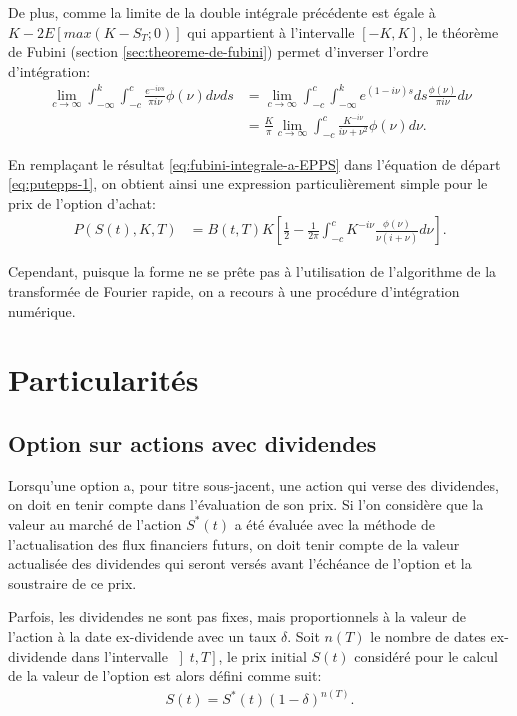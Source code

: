 De plus, comme la limite de la double intégrale précédente est égale à
$K-2E\left[max(K-S_T;0) \right]$ qui appartient à l'intervalle
$\left[-K,K\right]$, le théorème de Fubini (section
\ref{sec:theoreme-de-fubini}) permet d'inverser l'ordre d'intégration:
\begin{align}
  \lim_{c\to\infty} \int_{-\infty}^{k}\int_{-c}^{c} \frac{e^{-i\nu
      s}}{\pi i\nu}\phi(\nu)d\nu ds &= \lim_{c\to\infty} \int_{-c}^{c} \int_{-\infty}^{k}e^{(1-i\nu)s} ds \frac{\phi(\nu)}{\pi i \nu} d\nu \nonumber\\
  &= \frac{K}{\pi} \lim_{c\to\infty} \int_{-c}^{c}
  \frac{K^{-i\nu}}{i\nu+\nu^2}\phi(\nu)d\nu. \label{eq:fubini-integrale-a-EPPS}
\end{align}

En remplaçant le résultat \eqref{eq:fubini-integrale-a-EPPS} dans
l'équation de départ \eqref{eq:putepps-1}, on obtient ainsi une
expression particulièrement simple pour le prix de l'option d'achat:
\begin{align}
  P(S(t),K,T) &= B(t,T)K\left[\frac{1}{2}-\frac{1}{2\pi} \int_{-c}^c
    K^{-i\nu} \frac{\phi(\nu)}{\nu(i+\nu)}
    d\nu\right]. \label{eq:PutEpps8.37}
\end{align}

Cependant, puisque la forme ne se prête pas à l'utilisation de
l'algorithme de la transformée de Fourier rapide, on a recours à une
procédure d'intégration numérique.

\section{Particularités}
\label{sec:monnaiescontrats}

\subsection{Option sur actions avec dividendes}
\label{sec:dividentoptions}

Lorsqu'une option a, pour titre sous-jacent, une action qui verse des
dividendes, on doit en tenir compte dans l'évaluation de son prix. Si
l'on considère que la valeur au marché de l'action $S^{*}(t)$ a été
évaluée avec la méthode de l'actualisation des flux financiers futurs,
on doit tenir compte de la valeur actualisée des dividendes qui seront
versés avant l'échéance de l'option et la soustraire de ce prix.

Parfois, les dividendes ne sont pas fixes, mais proportionnels à la
valeur de l'action à la date ex-dividende avec un taux $\delta$. Soit
$n(T)$ le nombre de dates ex-dividende dans l'intervalle $\left] t,T
\right]$, le prix initial $S(t)$ considéré pour le calcul de la valeur
de l'option est alors défini comme suit:
\begin{align}
  \label{eq:prixinitialdividende}
  S(t) = S^{*}(t) (1-\delta)^{n(T)}.
\end{align}


